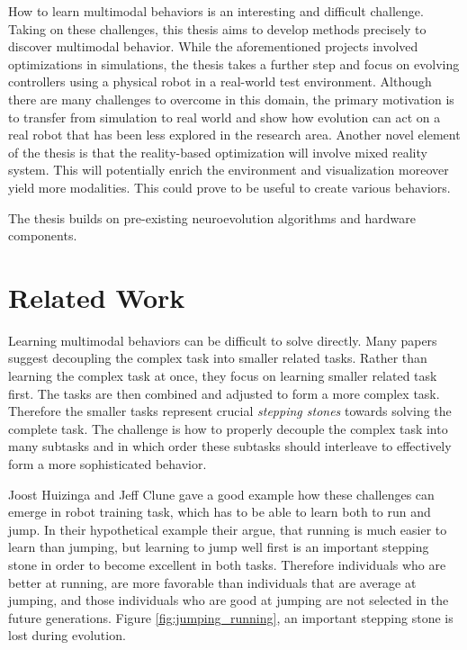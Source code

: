 \documentclass[format=acmsmall, review=false, screen=true]{acmart}
\begin{document}
How to learn multimodal behaviors is an interesting and difficult challenge. Taking on these challenges, this thesis aims to develop methods precisely to discover multimodal behavior. While the aforementioned projects involved optimizations in simulations, the thesis takes a further step and focus on evolving controllers using a physical robot in a real-world test environment. Although there are many challenges to overcome in this domain, the primary motivation is to transfer from simulation to real world and show how evolution can act on a real robot that has been less explored in the research area. Another novel element of the thesis is that the reality-based optimization will involve mixed reality system. This will potentially enrich the environment and visualization moreover yield more modalities. This could prove to be useful to create various behaviors.


The thesis builds on pre-existing neuroevolution algorithms and hardware components.

\section{Related Work}

Learning multimodal behaviors can be difficult to solve directly. Many papers suggest decoupling the complex task into smaller related tasks. Rather than learning the complex task at once, they focus on learning smaller related task first. The tasks are then combined and adjusted to form a more complex task. Therefore the smaller tasks represent crucial \emph{stepping stones} towards solving the complete task. The challenge is how to properly decouple the complex task into many subtasks and in which order these subtasks should interleave to effectively form a more sophisticated behavior.

Joost Huizinga and Jeff Clune gave a good example \cite{Huizinga2018EvolvingMR} how these challenges can emerge in robot training task, which has to be able to learn both to run and jump. In their hypothetical example their argue, that running is much easier to learn than jumping, but learning to jump well first is an important stepping stone in order to become excellent in both tasks. Therefore individuals who are better at running, are more favorable than individuals that are average at jumping, and those individuals who are good at jumping are not selected in the future generations. Figure \ref{fig:jumping_running}, an important stepping stone is lost during evolution.
\end{document}
